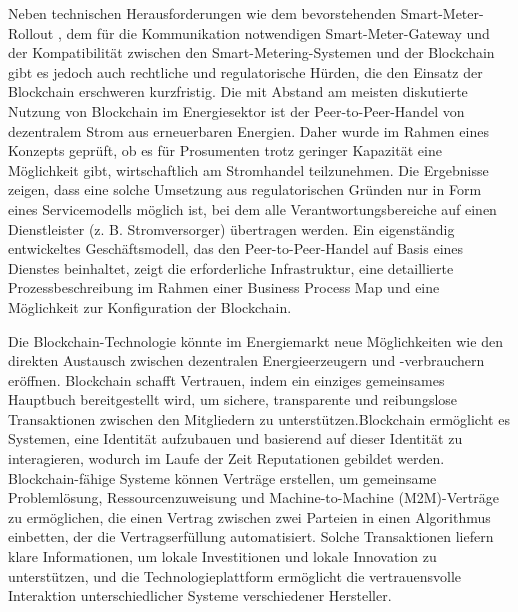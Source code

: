 Neben technischen Herausforderungen wie dem bevorstehenden Smart-Meter-Rollout \cite{bdew20} , dem für die Kommunikation notwendigen Smart-Meter-Gateway und der Kompatibilität zwischen den Smart-Metering-Systemen und der Blockchain gibt es jedoch auch rechtliche und regulatorische Hürden, die den Einsatz der Blockchain erschweren kurzfristig. Die mit Abstand am meisten diskutierte Nutzung von Blockchain im Energiesektor ist der Peer-to-Peer-Handel von dezentralem Strom aus erneuerbaren Energien. Daher wurde im Rahmen eines Konzepts geprüft, ob es für Prosumenten trotz geringer Kapazität eine Möglichkeit gibt, wirtschaftlich am Stromhandel teilzunehmen. Die Ergebnisse zeigen, dass eine solche Umsetzung aus regulatorischen Gründen nur in Form eines Servicemodells möglich ist, bei dem alle Verantwortungsbereiche auf einen Dienstleister (z. B. Stromversorger) übertragen werden. Ein eigenständig entwickeltes Geschäftsmodell, das den Peer-to-Peer-Handel auf Basis eines Dienstes beinhaltet, zeigt die erforderliche Infrastruktur, eine detaillierte Prozessbeschreibung im Rahmen einer Business Process Map und eine Möglichkeit zur Konfiguration der Blockchain.

Die Blockchain-Technologie könnte im Energiemarkt neue Möglichkeiten wie den direkten Austausch zwischen dezentralen Energieerzeugern und -verbrauchern eröffnen. Blockchain \cite{Enbw21} schafft Vertrauen, indem ein einziges gemeinsames Hauptbuch bereitgestellt wird, um sichere, transparente und reibungslose Transaktionen zwischen den Mitgliedern zu unterstützen.\clearpage Blockchain ermöglicht es Systemen, eine Identität aufzubauen und basierend auf dieser Identität zu interagieren, wodurch im Laufe der Zeit Reputationen gebildet werden. Blockchain-fähige Systeme können Verträge erstellen, um gemeinsame Problemlösung, Ressourcenzuweisung und Machine-to-Machine (M2M)-Verträge \cite{M2M} zu ermöglichen, die einen Vertrag zwischen zwei Parteien in einen Algorithmus einbetten, der die Vertragserfüllung automatisiert. Solche Transaktionen liefern klare Informationen, um lokale Investitionen und lokale Innovation zu unterstützen, und die Technologieplattform ermöglicht die vertrauensvolle Interaktion unterschiedlicher Systeme verschiedener Hersteller.

